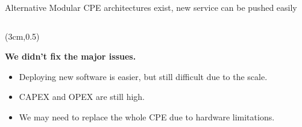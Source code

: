 \documentclass[a4paper]{beamer}
\begin{document}
\begin{frame}{Alternative Modular CPE architectures exist, new service can be pushed easily}
\begin{columns}[T]
\begin{column}[T]{0.70 \textwidth}
																																							
		\end{column}
																										
	\end{columns}
							
								
								
							
	\begin{textblock*}{7cm}(3cm,0.5\textheight)
		\begin{alertblock}{}
			\textbf{  We didn't fix the major issues. }
			\begin{itemize}
				\item Deploying new software is easier, but still difficult due to the scale.
				\item CAPEX and OPEX are still high.
				\item We may need to replace the whole CPE due to hardware limitations.
			\end{itemize}
		\end{alertblock}
	\end{textblock*}			
											
									
										
\end{frame}
\end{document}
